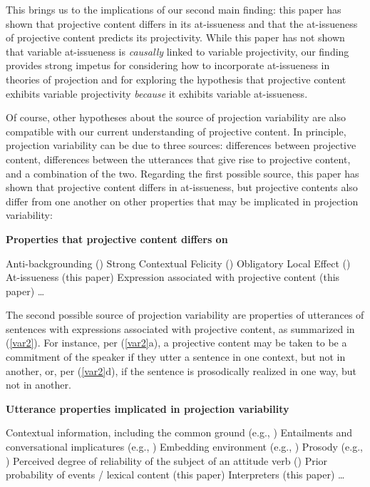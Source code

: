 \documentclass[11pt,fleqn]{article}
\newcommand{\6}{\mbox{$[\hspace*{-.6mm}[$}}
\newcommand{\9}{\mbox{$]\hspace*{-.6mm}]$}}
\begin{document}
This brings us to the implications of our second main finding: this paper has shown that projective content differs in its at-issueness and that the at-issueness of projective content predicts its projectivity. While this paper has not shown that variable at-issueness is {\em causally} linked to variable projectivity, our finding provides strong impetus for considering how to incorporate at-issueness in theories of projection and for exploring the hypothesis that projective content exhibits variable projectivity {\em because} it exhibits variable at-issueness. 

Of course, other hypotheses about the source of projection variability are also compatible with our current understanding of projective content. In principle, projection variability can be due to three sources: differences between projective content, differences between the utterances that give rise to projective content, and a combination of the two. Regarding the first possible source, this paper has shown that projective content differs in at-issueness, but projective contents also differ from one another on other properties that may be implicated in projection variability:

\begin{exe}
\ex\label{var1} {\bf Properties that projective content differs on}
\begin{xlist}
\ex Anti-backgrounding (\citealt{potts05}) 
\ex Strong Contextual Felicity (\citealt{brst-lang11}) 
\ex Obligatory Local Effect (\citealt{brst-lang11}) 
\ex At-issueness (this paper) 
\ex Expression associated with projective content (this paper) 
\ex \ldots 
\end{xlist}
\end{exe}

The second possible source of projection variability are properties of utterances of sentences with expressions associated with projective content, as summarized in (\ref{var2}). For instance, per (\ref{var2}a), a projective content may be taken to be a commitment of the speaker if they utter a sentence in one context, but not in another, or, per (\ref{var2}d), if the sentence is prosodically realized in one way, but not in another. 

\begin{exe}
\ex\label{var2} {\bf Utterance properties implicated in projection variability}
\begin{xlist}
\ex Contextual information, including the common ground (e.g., \citealt{gazdar79a,gazdar79b})
\ex Entailments and conversational implicatures (e.g., \citealt{gazdar79a,gazdar79b})
\ex Embedding environment (e.g., \citealt{smith-hall-cls})
\ex Prosody (e.g., \citealt{abrusan2011,cummins-rohde2015,tonhauser-salt26,stevens-etal2017}) 
\ex Perceived degree of reliability of the subject of an attitude verb (\citealt{schlenker10})
\ex Prior probability of events / lexical content (this paper)
\ex Interpreters (this paper)
\ex \ldots 
\end{xlist}
\end{exe}
\end{document}
